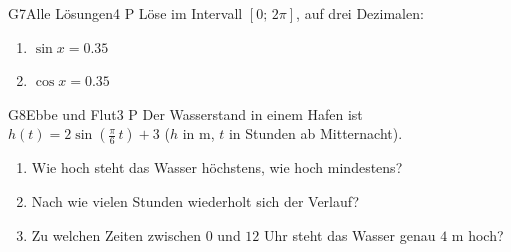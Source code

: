 \documentclass[11pt]{article}
\begin{document}
\begin{lpaufgabe}{G7}{Alle Lösungen}{4 P}
Löse im Intervall $[0;\, 2\pi]$, auf drei Dezimalen:
\begin{enumerate}[label=(\alph*),leftmargin=*,itemsep=1pt]
\item $\sin x = 0.35$
\item $\cos x = 0.35$
\end{enumerate}
\end{lpaufgabe}

\begin{lpaufgabe}{G8}{Ebbe und Flut}{3 P}
Der Wasserstand in einem Hafen ist $h(t) = 2\sin\left(\tfrac{\pi}{6}\,t\right) + 3$ ($h$ in m, $t$ in Stunden ab Mitternacht).
\begin{enumerate}[label=(\alph*),leftmargin=*,itemsep=1pt]
\item Wie hoch steht das Wasser höchstens, wie hoch mindestens?
\item Nach wie vielen Stunden wiederholt sich der Verlauf?
\item Zu welchen Zeiten zwischen $0$ und $12$ Uhr steht das Wasser genau $4$ m hoch?
\end{enumerate}
\end{lpaufgabe}
\end{document}

